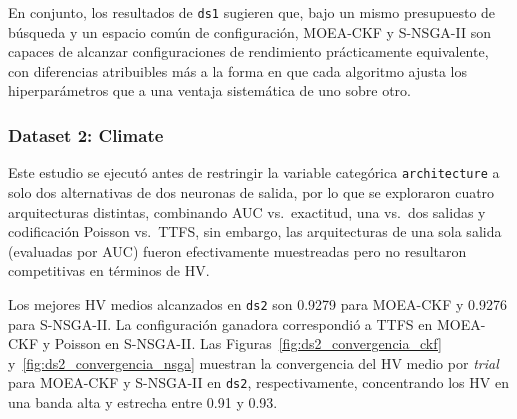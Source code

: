 En conjunto, los resultados de \texttt{ds1} sugieren que, bajo un mismo presupuesto de búsqueda y un espacio común de configuración, MOEA-CKF y S-NSGA-II son capaces de alcanzar configuraciones de rendimiento prácticamente equivalente, con diferencias atribuibles más a la forma en que cada algoritmo ajusta los hiperparámetros que a una ventaja sistemática de uno sobre otro.

\subsubsection{Dataset 2: Climate}

Este estudio se ejecutó antes de restringir la variable categórica \texttt{architecture} a solo dos alternativas de dos neuronas de salida, por lo que se exploraron cuatro arquitecturas distintas, combinando AUC vs.\ exactitud, una vs.\ dos salidas y codificación Poisson vs.\ TTFS, sin embargo, las arquitecturas de una sola salida (evaluadas por AUC) fueron efectivamente muestreadas pero no resultaron competitivas en términos de HV.


Los mejores HV medios alcanzados en \texttt{ds2} son 0.9279 para MOEA-CKF y 0.9276 para S-NSGA-II. La configuración ganadora correspondió a TTFS en MOEA-CKF y Poisson en S-NSGA-II. Las Figuras~\ref{fig:ds2_convergencia_ckf} y~\ref{fig:ds2_convergencia_nsga} muestran la convergencia del HV medio por \emph{trial} para MOEA-CKF y S-NSGA-II en \texttt{ds2}, respectivamente, concentrando los HV en una banda alta y estrecha entre 0.91 y 0.93.

